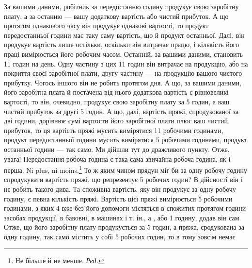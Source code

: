 За вашими даними, робітник за передостанню годину продукує свою заробітну плату, а за останню — вашу
додаткову вартість або чистий прибуток. А що протягом однакового часу він продукує
однакові вартості, то продукт передостанньої години має таку
саму вартість, що й продукт останньої. Далі, він продукує вартість лише остільки, оскільки він
витрачає працю, і кількість
його праці вимірюється його робочим часом. Останній, за вашими даними, становить 11 годин на
день. Одну частину з цих 11 годин
він витрачає на продукцію, або на покриття своєї заробітної плати, другу частину — на продукцію
вашого чистого прибутку. Чогось іншого він не робить протягом дня. А що, за вашими даними, його
заробітна плата й постачена від нього додаткова вартість є рівновеликі вартості, то він, очевидно,
продукує свою заробітну плату за 5 годин, а ваш чистий прибуток за другі
5 годин. А що, далі, вартість пряжі, спродукованої за дві години, дорівнює сумі вартости його
заробітної плати плюс ваш
чистий прибуток, то ця вартість пряжі мусить вимірятися 11 робочими
годинами, продукт передостанньої години мусить вимірятися 5 робочими годинами, продукт останньої
години — так
само. Ми дійшли тут до дражливого пункту. Отже, увага! Передостання робоча година є така сама
звичайна робоча година, як і
перша. Ni plus, ni moins.\footnote*{
Не більше й не менше. \emph{Ред.}
} То ж яким чином прядун міг би за одну робочу годину спродукувати
вартість пряжі, що репрезентує 5 робочих годин? В дійсності він і не робить такого дива. Та
споживна вартість, яку він продукує за одну робочу годину, є певна кількість пряжі. Вартість цієї
пряжі вимірюється 5 робочими годинами, з яких 4 вже без його допомоги містяться в спожитих
протягом години засобах продукції, в бавовні, в машинах і т. ін., а , або 1 годину, додав він
сам. Отже, що його заробітну плату продукується за 5 годин, а пряжа, сродукована за одну годину,
так само містить у собі 5 робочих годин, то в тому зовсім немає
\parbreak{}  %
